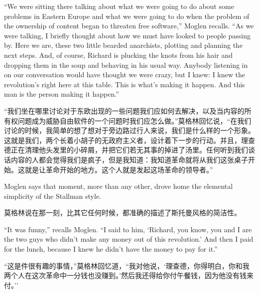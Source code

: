 \ifdefined\eng
``We were sitting there talking about what we were going to do about some problems in Eastern Europe and what we were going to do when the problem of the ownership of content began to threaten free software,'' Moglen recalls. ``As we were talking, I briefly thought about how we must have looked to people passing by. Here we are, these two little bearded anarchists, plotting and planning the next steps. And, of course, Richard is plucking the knots from his hair and dropping them in the soup and behaving in his usual way. Anybody listening in on our conversation would have thought we were crazy, but I knew: I knew the revolution's right here at this table. This is what's making it happen. And this man is the person making it happen.''
\fi

\ifdefined\chs
``我们坐在哪里讨论对于东欧出现的一些问题我们应如何去解决，以及当内容的所有权问题成为威胁自由软件的一个问题时我们应怎么做。''莫格林回忆说，``在我们讨论的时候，我简单的想了想对于旁边路过行人来说，我们是什么样的一个形象。这就是我们，两个长着小胡子的无政府主义者，设计着下一步的行动。并且，理查德正在清理他头发里的小碎屑，并把它们若无其事的掉进了汤里。任何听到我们谈话内容的人都会觉得我们是疯子，但是我知道：我知道革命就将从我们这张桌子开始。这就是让革命开始的地方。这个人就是发起这场革命的领导者。''
\fi

\ifdefined\eng
Moglen says that moment, more than any other, drove home the elemental simplicity of the Stallman style.
\fi

\ifdefined\chs
莫格林说在那一刻，比其它任何时候，都准确的描述了斯托曼风格的简洁性。
\fi

\ifdefined\eng
``It was funny,'' recalls Moglen. ``I said to him, `Richard, you know, you and I are the two guys who didn't make any money out of this revolution.' And then I paid for the lunch, because I knew he didn't have the money to pay for it.''%
\fi

\ifdefined\chs
``这是件很有趣的事情，''莫格林回忆道，``我对他说，`理查德，你得明白，你和我两个人在这次革命中一分钱也没赚到。'然后我还得给你付午餐钱，因为他没有钱来付。'' %
\fi

\theendnotes
\setcounter{endnote}{0}
